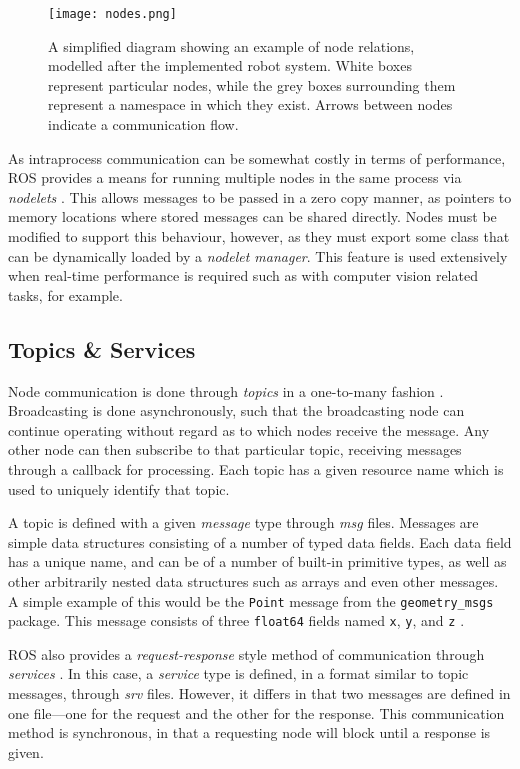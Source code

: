 \begin{figure}[!h]
    \centering
    \texttt{[image: nodes.png]}
    \caption{A simplified diagram showing an example of node relations, modelled after the implemented robot system. White boxes represent particular nodes, while the grey boxes surrounding them represent a namespace in which they exist. Arrows between nodes indicate a communication flow.}
    \label{fig:nodes}
\end{figure}

As intraprocess communication can be somewhat costly in terms of performance, ROS provides a means for running multiple nodes in the same process via \emph{nodelets} \cite{ros_wiki_nodelet}. This allows messages to be passed in a zero copy manner, as pointers to memory locations where stored messages can be shared directly. Nodes must be modified to support this behaviour, however, as they must export some class that can be dynamically loaded by a \emph{nodelet manager}. This feature is used extensively when real-time performance is required such as with computer vision related tasks, for example.

\subsection{Topics \& Services}
Node communication is done through \emph{topics} in a one-to-many fashion \cite{ros_paper}. Broadcasting is done asynchronously, such that the broadcasting node can continue operating without regard as to which nodes receive the message. Any other node can then subscribe to that particular topic, receiving messages through a callback for processing. Each topic has a given resource name which is used to uniquely identify that topic.

A topic is defined with a given \emph{message} type through \emph{msg} files. Messages are simple data structures consisting of a number of typed data fields. Each data field has a unique name, and can be of a number of built-in primitive types, as well as other arbitrarily nested data structures such as arrays and even other messages. A simple example of this would be the \texttt{Point} message from the \texttt{geometry\_msgs} package. This message consists of three \texttt{float64} fields named \texttt{x}, \texttt{y}, and \texttt{z} \cite{ros_api_point_msg}.

ROS also provides a \emph{request-response} style method of communication through \emph{services} \cite{ros_wiki_services}. In this case, a \emph{service} type is defined, in a format similar to topic messages, through \emph{srv} files. However, it differs in that two messages are defined in one file---one for the request and the other for the response. This communication method is synchronous, in that a requesting node will block until a response is given. 

